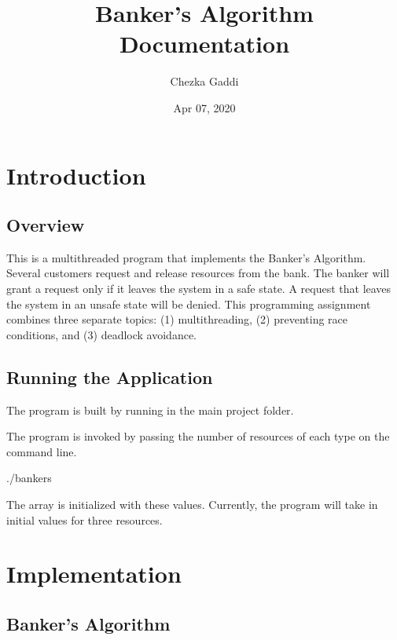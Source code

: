 \documentclass[letterpaper,10pt,english,openany,oneside]{sphinxmanual}
\title{Banker's Algorithm Documentation}
\date{Apr 07, 2020}
\author{Chezka Gaddi}
\begin{document}
\pagestyle{empty}
\sphinxmaketitle
\pagestyle{plain}
\sphinxtableofcontents
\pagestyle{normal}
\label{\detokenize{index::doc}}



\chapter{Introduction}
\label{\detokenize{intro:introduction}}\label{\detokenize{intro::doc}}

\section{Overview}
\label{\detokenize{intro:overview}}
This is a multi\sphinxhyphen{}threaded program that implements the Banker’s Algorithm. Several customers request and release resources from the bank. The banker will grant a request only if it leaves the system in a safe state. A request that leaves the system in an unsafe state will be denied. This programming assignment combines three separate topics:
(1) multi\sphinxhyphen{}threading, (2) preventing race conditions, and (3) deadlock avoidance.


\section{Running the Application}
\label{\detokenize{intro:running-the-application}}
The program is built by running  in the main project folder.

The program is invoked by passing the number of resources of each type on the command line.

\begin{sphinxVerbatim}[commandchars=\\\{\}]
./bankers   
\end{sphinxVerbatim}

The  array is initialized with these values. Currently, the program will take in initial values for three resources.


\chapter{Implementation}
\label{\detokenize{implementation:implementation}}\label{\detokenize{implementation::doc}}

\section{Banker’s Algorithm}
\label{\detokenize{implementation:banker-s-algorithm}}
\end{document}
